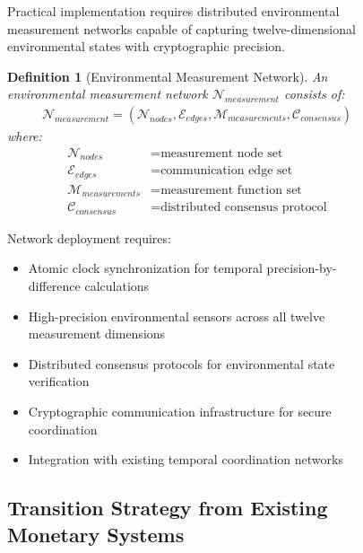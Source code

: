 \documentclass[12pt,a4paper]{article}
\newtheorem{definition}[theorem]{Definition}
\begin{document}
\begin{figure}[H]
Practical implementation requires distributed environmental measurement networks capable of capturing twelve-dimensional environmental states with cryptographic precision.

\begin{definition}[Environmental Measurement Network]
An environmental measurement network $\mathcal{N}_{measurement}$ consists of:
\begin{align}
\mathcal{N}_{measurement} = (\mathcal{N}_{nodes}, \mathcal{E}_{edges}, \mathcal{M}_{measurements}, \mathcal{C}_{consensus})
\end{align}
where:
\begin{align}
\mathcal{N}_{nodes} &= \text{measurement node set} \\
\mathcal{E}_{edges} &= \text{communication edge set} \\
\mathcal{M}_{measurements} &= \text{measurement function set} \\
\mathcal{C}_{consensus} &= \text{distributed consensus protocol}
\end{align}
\end{definition}

Network deployment requires:
\begin{itemize}
\item Atomic clock synchronization for temporal precision-by-difference calculations
\item High-precision environmental sensors across all twelve measurement dimensions
\item Distributed consensus protocols for environmental state verification
\item Cryptographic communication infrastructure for secure coordination
\item Integration with existing temporal coordination networks
\end{itemize}

\subsection{Transition Strategy from Existing Monetary Systems}


\end{figure}
\end{document}
